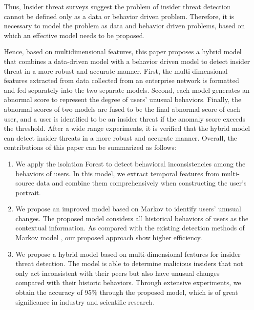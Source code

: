 \documentclass[conference]{IEEEtran}
\begin{document}
Thus, Insider threat surveys \cite{b9} suggest the problem of insider threat detection cannot be defined only as a data or behavior driven problem. Therefore, it is necessary to model the problem as data and behavior driven problems, based on which an effective model needs to be proposed.

Hence, based on multidimensional features, this paper proposes a hybrid model that combines a data-driven model with a behavior driven model to detect insider threat in a more robust and accurate manner.
First, the multi-dimensional features extracted from data collected from an enterprise network is formatted and fed separately into the two separate models. Second, each model generates an abnormal score to represent the degree of users' unusual behaviors. Finally, the abnormal scores of two models are fused to be the final abnormal score of each user, and a user is identified to be an insider threat if the anomaly score exceeds the threshold. 
After a wide range experiments, it is 
verified that the hybrid model can detect insider threats in a more robust and accurate manner.
Overall, the contributions of this paper can be summarized as follows:


\begin{enumerate}
\item 
We apply the isolation Forest to detect behavioral inconsistencies among the behaviors of users. In this model, we extract temporal features from multi-source data and combine them comprehensively when constructing the user's portrait.

\item We propose an improved model based on Markov to identify users' unusual changes. The proposed model considers all historical behaviors of users as the contextual information. As compared with the existing detection methods of Markov model \cite{b7}, our proposed approach show higher efficiency.


\item We propose a hybrid model based on multi-dimensional features for insider threat detection. The model is able to determine malicious insiders that not only act inconsistent with their peers but also have unusual changes compared with their historic behaviors. 
Through extensive experiments, we obtain the accuracy of 95\% through the proposed model, which is of great significance in industry and scientific research.
 


\end{enumerate}
\end{document}

